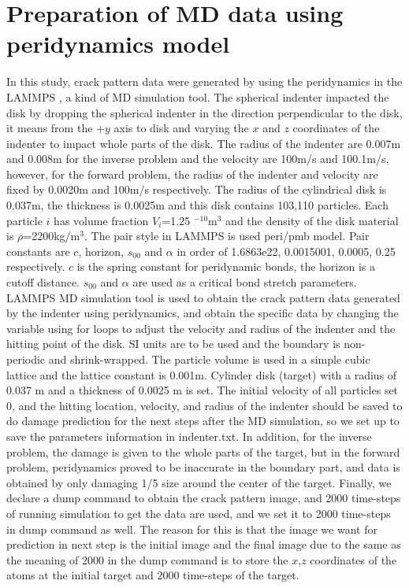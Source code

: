\section{Preparation of MD data using peridynamics model }
\label{sec:3}

In this study, crack pattern data were generated by using the peridynamics in the LAMMPS \cite{Ref15}, a kind of MD simulation tool.
The spherical indenter impacted the disk by dropping the spherical indenter in the direction perpendicular to the disk, it means from the ${+y}$ axis to disk and varying the $x$ and $z$ coordinates of the indenter to impact whole parts of the disk. The radius of the indenter are 0.007m and 0.008m for the inverse problem and the velocity are 100m/s and 100.1m/s, however, for the forward problem, the radius of the indenter and velocity are fixed by 0.0020m and 100m/s respectively. The radius of the cylindrical disk is 0.037m, the thickness is 0.0025m and this disk contains 103,110 particles. Each particle $i$ has volume fraction $V_i$=1.25 $^{-10}$m$^3$ and the density of the disk material is $\rho$=2200kg/m$^3$. The pair style in LAMMPS is used peri/pmb model. Pair constants are $c$, horizon, $s_{00}$ and $\alpha$ in order of 1.6863e22, 0.0015001, 0.0005, 0.25 respectively. $c$ is the spring constant for peridynamic bonds, the horizon is a cutoff distance. $s_{00}$ and $\alpha$ are used as a critical bond stretch parameters. LAMMPS MD simulation tool is used to obtain the crack pattern data generated by the indenter using peridynamics, and obtain the specific data by changing the variable using for loops to adjust the velocity and radius of the indenter and the hitting point of the disk. SI units are to be used and the boundary is non-periodic and shrink-wrapped. The particle volume is used in a simple cubic lattice and the lattice constant is 0.001m. Cylinder disk (target) with a radius of 0.037 m and a thickness of 0.0025 m is set. The initial velocity of all particles set 0, and the hitting location, velocity, and radius of the indenter should be saved to do damage prediction for the next steps after the MD simulation, so we set up to save the parameters information in indenter.txt. In addition, for the inverse problem, the damage is given to the whole parts of the target, but in the forward problem, peridynamics proved to be inaccurate in the boundary part, and data is obtained by only damaging 1/5 size around the center of the target. Finally, we declare a dump command to obtain the crack pattern image, and 2000 time-steps of running simulation to get the data are used, and we set it to 2000 time-steps in dump command as well. The reason for this is that the image we want for prediction in next step is the initial image and the final image due to the same as the meaning of 2000 in the dump command is to store the $x$,$z$ coordinates of the atoms at the initial target and 2000 time-steps of the target. 

